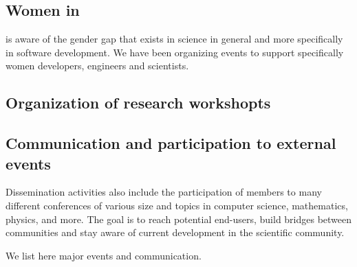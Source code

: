 \documentclass{deliverablereport}
\begin{document}
\subsection{Women in \ODK}

\ODK is aware of the gender gap that exists in science in general
and more specifically in software development. We have been organizing
events to support specifically women developers, engineers and scientists.









\subsection{Organization of research workshopts}







\subsection{Communication and participation to external events}

Dissemination activities also include the participation of \ODK
members to many different conferences of various size and topics
in computer science, mathematics, physics, and more. The goal is
to reach potential end-users, build bridges between communities and stay aware 
of current development in the scientific community.

We list here major events and communication. 
















\end{document}

